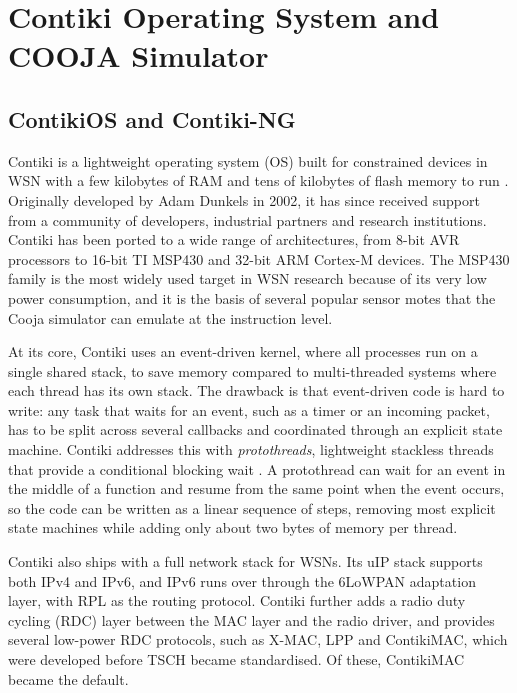 \section{Contiki Operating System and COOJA Simulator}
\subsection{ContikiOS and Contiki-NG}
Contiki is a lightweight operating system (OS) built for constrained
devices in WSN with a few kilobytes of RAM and tens of kilobytes of
flash memory to run \cite{contiki}.
Originally developed by Adam Dunkels in 2002, it has since received support
from a community of developers, industrial partners and research institutions.
Contiki has been ported to a wide range of architectures, from 8-bit
AVR processors to
16-bit TI MSP430 and 32-bit ARM Cortex-M devices.
The MSP430 family is the most widely used target in WSN research
because of its very low power consumption, and it is the basis of several
popular sensor motes that the Cooja simulator can emulate at the instruction
level.

At its core, Contiki uses an event-driven kernel, where all processes
run on a single shared stack, to save memory compared to
multi-threaded systems where each thread has its own stack. The drawback is that
event-driven code is hard to write: any task that waits for an event,
such as a timer or an incoming packet, has to be split across several
callbacks and coordinated through an explicit state machine. Contiki
addresses this with \emph{protothreads}, lightweight stackless threads
that provide a conditional blocking wait \cite{dunkels2006protothreads}.
A protothread can wait for an event in the middle of a function and
resume from the same point when the event occurs, so the code can be
written as a linear sequence of steps, removing most
explicit state machines while adding only about two bytes of memory
per thread. %

Contiki also ships with a full network stack for WSNs. Its uIP stack
supports both IPv4 and IPv6, and IPv6 runs over \ieeemac{} through the
6LoWPAN adaptation layer, with RPL as the routing protocol. Contiki
further adds a radio duty cycling (RDC) layer between the MAC layer
and the radio driver, and provides several low-power RDC protocols,
such as X-MAC, LPP and ContikiMAC, which were developed before TSCH
became standardised. Of these, ContikiMAC became the default.

